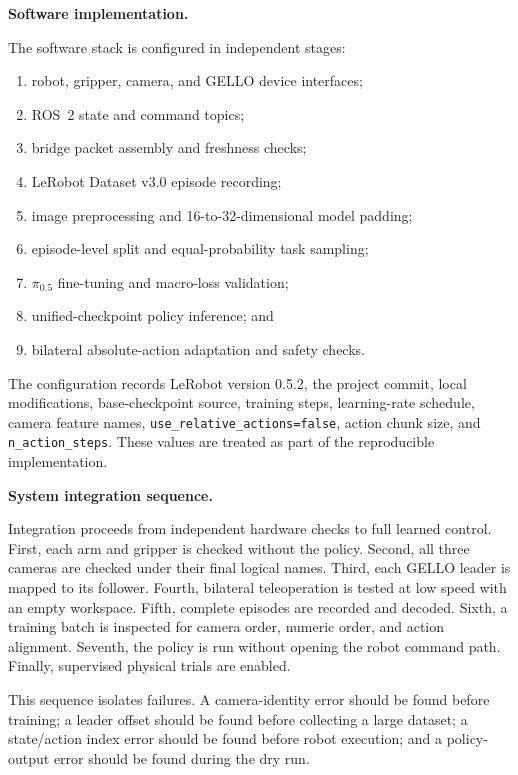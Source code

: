 \medskip
\noindent\textbf{Software implementation.}

The software stack is configured in independent stages:
\begin{enumerate}
  \item robot, gripper, camera, and GELLO device interfaces;
  \item ROS~2 state and command topics;
  \item bridge packet assembly and freshness checks;
  \item LeRobot Dataset v3.0 episode recording;
  \item image preprocessing and 16-to-32-dimensional model padding;
  \item episode-level split and equal-probability task sampling;
  \item $\pi_{0.5}$ fine-tuning and macro-loss validation;
  \item unified-checkpoint policy inference; and
  \item bilateral absolute-action adaptation and safety checks.
\end{enumerate}

The configuration records LeRobot version 0.5.2, the project commit, local modifications, base-checkpoint source, training steps, learning-rate schedule, camera feature names, \texttt{use\_relative\_actions=false}, action chunk size, and \texttt{n\_action\_steps}. These values are treated as part of the reproducible implementation.

\medskip
\noindent\textbf{System integration sequence.}

Integration proceeds from independent hardware checks to full learned control. First, each arm and gripper is checked without the policy. Second, all three cameras are checked under their final logical names. Third, each GELLO leader is mapped to its follower. Fourth, bilateral teleoperation is tested at low speed with an empty workspace. Fifth, complete episodes are recorded and decoded. Sixth, a training batch is inspected for camera order, numeric order, and action alignment. Seventh, the policy is run without opening the robot command path. Finally, supervised physical trials are enabled.

This sequence isolates failures. A camera-identity error should be found before training; a leader offset should be found before collecting a large dataset; a state/action index error should be found before robot execution; and a policy-output error should be found during the dry run.

